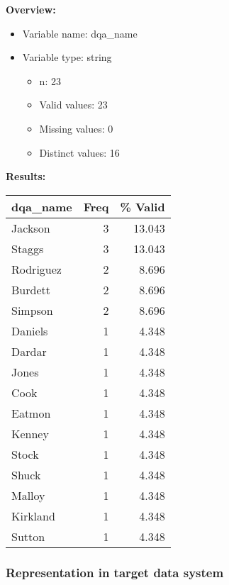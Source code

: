 \documentclass[
]{article}
\providecommand{\tightlist}{%
  \setlength{\itemsep}{0pt}\setlength{\parskip}{0pt}}
\begin{document}
\textbf{Overview:}

\begin{itemize}
\tightlist
\item
  Variable name: dqa\_name
\item
  Variable type: string

  \begin{itemize}
  \tightlist
  \item
    n: 23
  \item
    Valid values: 23
  \item
    Missing values: 0
  \item
    Distinct values: 16
  \end{itemize}
\end{itemize}

\textbf{Results:}\\

\begin{table}[H]
\centering
\begin{tabular}{l|r|r}
\hline
\textbf{dqa\_name} & \textbf{Freq} & \textbf{\% Valid}\\
\hline
Jackson & 3 & 13.043\\
\hline
Staggs & 3 & 13.043\\
\hline
Rodriguez & 2 & 8.696\\
\hline
Burdett & 2 & 8.696\\
\hline
Simpson & 2 & 8.696\\
\hline
Daniels & 1 & 4.348\\
\hline
Dardar & 1 & 4.348\\
\hline
Jones & 1 & 4.348\\
\hline
Cook & 1 & 4.348\\
\hline
Eatmon & 1 & 4.348\\
\hline
Kenney & 1 & 4.348\\
\hline
Stock & 1 & 4.348\\
\hline
Shuck & 1 & 4.348\\
\hline
Malloy & 1 & 4.348\\
\hline
Kirkland & 1 & 4.348\\
\hline
Sutton & 1 & 4.348\\
\hline
\end{tabular}
\end{table}
\newpage

\hypertarget{representation-in-target-data-system-9}{%
\subsubsection{\texorpdfstring{Representation in \textbf{target} data
system}{Representation in target data system}}\label{representation-in-target-data-system-9}}
\end{document}
